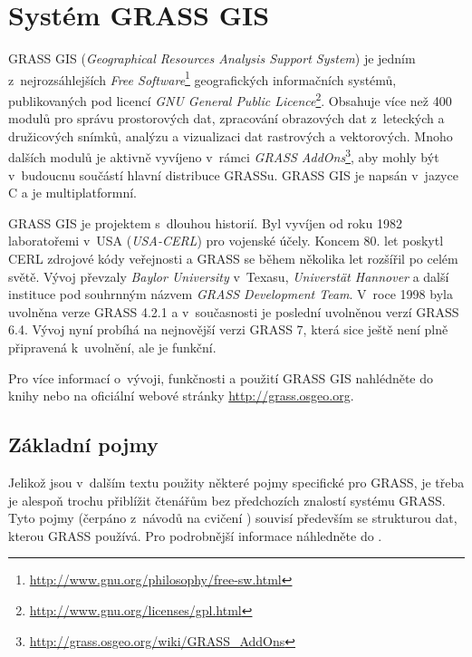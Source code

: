 \documentclass[a4paper,12pt,draft]{article}
\newif\ifbc %
\begin{document}
\fi
\section{Systém GRASS GIS}
\label{sec:grass}
GRASS GIS (\emph{Geographical Resources Analysis Support
System}) je jedním z~nejrozsáhlejších \emph{Free
Software}\footnote{\url{http://www.gnu.org/philosophy/free-sw.html}}
geografických informačních systémů,
publikovaných pod licencí \emph{GNU General Public
Licence}\footnote{\url{http://www.gnu.org/licenses/gpl.html}}. Obsahuje více
než 400 modulů pro správu prostorových dat, zpracování obrazových dat
z~leteckých a družicových snímků, analýzu a vizualizaci dat rastrových
a vektorových. Mnoho dalších modulů je aktivně vyvíjeno v~rámci \emph{GRASS
AddOns}\footnote{\url{http://grass.osgeo.org/wiki/GRASS_AddOns}}, aby mohly být
v~budoucnu součástí hlavní distribuce GRASSu. GRASS GIS je napsán v~jazyce C a
je multiplatformní.

GRASS GIS je projektem s~dlouhou historií. Byl vyvíjen od roku
1982 laboratořemi v~USA (\emph{USA-CERL}) pro vojenské účely. Koncem
80. let poskytl CERL zdrojové kódy veřejnosti a GRASS se během několika
let rozšířil po celém světě. Vývoj převzaly \emph{Baylor University}
v~Texasu, \emph{Universtät Hannover} a další instituce pod souhrnným názvem
\emph{GRASS Development Team}. V~roce 1998 byla uvolněna verze GRASS
4.2.1 a v~současnosti je poslední uvolněnou verzí GRASS 6.4. Vývoj
nyní probíhá na nejnovější verzi GRASS 7, která sice ještě není plně
připravená k~uvolnění, ale je funkční.

Pro více informací o~vývoji, funkčnosti a použití GRASS GIS nahlédněte
do knihy \cite{grass_gis} nebo na oficiální webové stránky
\url{http://grass.osgeo.org}.
\ifbc
Postup instalace pro operační systém \emph{Linux}, distribuci \emph{Debian} a
\emph{Ubuntu} lze najít v~příloze \ref{priloha:instalace} nebo detailněji na
stránkách \cite{instalace}.
\fi

\subsection{Základní pojmy}
\label{sec:grass:pojmy}
Jelikož jsou v~dalším textu použity některé pojmy specifické pro GRASS,
je třeba je alespoň trochu přiblížit čtenářům bez předchozích
znalostí systému GRASS. Tyto pojmy
(čerpáno z~návodů na cvičení \cite{YZOD}) souvisí především se strukturou dat,
kterou GRASS používá. Pro podrobnější informace náhledněte do \cite{grass_gis}.
\end{document}
